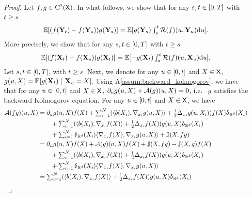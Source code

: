   \begin{proof}
    Let $f, g \in \mathrm{C}^2(\mathsf{X})$. In what follows, we show that for any $s, t \in [ 0,T ]$ with $t \geq s$
    \begin{equation}
      \textstyle \mathbb{E}[(f(\mathbf{Y}_t) - f(\mathbf{Y}_s))g(\mathbf{Y}_s) ] = \mathbb{E}[g(\mathbf{Y}_s) \int_s^t \mathcal{R}(f)(u, \mathbf{Y}_u) \mathrm{d} u ] . 
    \end{equation}
    More precisely, we  show that for any $s, t \in [ 0,T ]$ with $t \geq s$
    \begin{equation}
      \textstyle \mathbb{E}[(f(\mathbf{X}_t) - f(\mathbf{X}_s))g(\mathbf{X}_t) ] = \mathbb{E}[-g(\mathbf{X}_t) \int_s^t \mathcal{R}(f)(u, \mathbf{X}_u) \mathrm{d} u ] . 
    \end{equation}
    Let $s, t \in [ 0,T ]$, with $t \geq s$. Next, we denote for any
    $u \in [ 0,t ]$ and $X \in \mathsf{X}$,
    $g(u,X) = \mathbb{E}[g(\mathbf{X}_t) \ | \ \mathbf{X}_u=X]$. Using
    A\ref{assum:backward_kolmogorov}, we have that for any $u \in [ 0,t ]$
    and $X \in \mathsf{X}$, $\partial_u g(u,X) + {\mathcal{A}}(g)(u,X) = 0$, i.e.~ $g$
    satisfies the backward Kolmogorov equation. For any $u \in [ 0,t ]$ and
    $X \in \mathsf{X}$, we have
    \begin{align}
      \gA(fg)(u, X) &= \textstyle \partial_u g(u,X) f(X) + \sum_{i=1}^N (\langle b(X_i), \nabla_{x_i} g(u,X) \rangle + \tfrac{1}{2} \Delta_{x_i} g(u,X_i)) f(X) \updelta_{\rset^d}(X_i) \\
                      &\qquad \textstyle +\sum_{i=1}^N (\langle b(X_i), \nabla_{x_i} f(X) \rangle + \tfrac{1}{2} \Delta_{x_i} f(X)) g(u,X) \updelta_{\rset^d}(X_i) \\
                      & \qquad \textstyle + \sum_{i=1}^N \updelta_{\rset^d}(X_i) \langle \nabla_{x_i} f(X), \nabla_{x_i} g(u,X) \rangle 
                        + \Jbb(X, fg) \\
                      &= \partial_u g(u,X) f(X) + \gA(g)(u,X) f(X)+ \Jbb(X, fg) - \Jbb(X, g)f(X)  \\
                      &\qquad \textstyle +\sum_{i=1}^N (\langle b(X_i), \nabla_{x_i} f(X) \rangle + \tfrac{1}{2} \Delta_{x_i} f(X)) g(u,X) \updelta_{\rset^d}(X_i) \\
                      & \qquad \textstyle + \sum_{i=1}^N \updelta_{\rset^d}(X_i) \langle \nabla_{x_i} f(X), \nabla_{x_i} g(u,X) \rangle \\
                      &= \textstyle \sum_{i=1}^N (\langle b(X_i), \nabla_{x_i} f(X) \rangle + \tfrac{1}{2} \Delta_{x_i} f(X)) g(u,X) \updelta_{\rset^d}(X_i)  \\

\end{align}
\end{proof}
